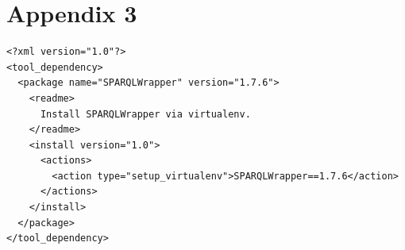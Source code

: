 \documentclass[12pt]{article}
\begin{document}
\section*{Appendix 3}
\begin{Verbatim}
<?xml version="1.0"?>
<tool_dependency>
  <package name="SPARQLWrapper" version="1.7.6">
    <readme>
      Install SPARQLWrapper via virtualenv.
    </readme>
    <install version="1.0">
      <actions>
        <action type="setup_virtualenv">SPARQLWrapper==1.7.6</action>
      </actions>
    </install>
  </package>
</tool_dependency>
\end{Verbatim}
\end{document}
